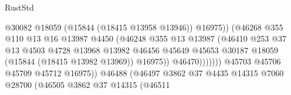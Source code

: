 \begin{lexlean}{RustStd}
\begin{coremodule}
                                                    @30082
                                                    @18059
                                                    (@15844 (@18415 @13958 @13946))
                                                    @16975))
                                                (@46268
                                                  @355
                                                  @110
                                                  @13
                                                  @16
                                                  @13987
                                                  @4450
                                                  (@46248
                                                    @355
                                                    @13
                                                    @13987
                                                    (@46410
                                                      @253
                                                      @37
                                                      @13
                                                      @4503
                                                      @4728
                                                      @13968
                                                      @13982
                                                      @46456
                                                      @45649
                                                      @45653
                                                      @30187
                                                      @18059
                                                      (@15844 (@18415 @13982 @13969))
                                                      @16975))
                                                  @46470)))))))
                                    @45703
                                    @45706
                                    @45709
                                    @45712
                                    @16975))
                                @46488
                                (@46497
                                  @3862
                                  @37
                                  @4435
                                  @14315
                                  @7060
                                  @28700
                                  (@46505
                                    @3862
                                    @37
                                    @14315
                                    (@46511

\end{coremodule}
\end{lexlean}
